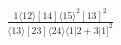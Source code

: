 \documentclass[varwidth, border=5pt]{standalone}
\begin{document}
\begin{my}
$\begin{gathered}
\scriptscriptstyle\frac{1⟨12⟩[14]⟨15⟩^2[13]^2}{⟨13⟩[23]⟨24⟩⟨1|2+3|1]^2}
\end{gathered}$
\end{my}
\end{document}

